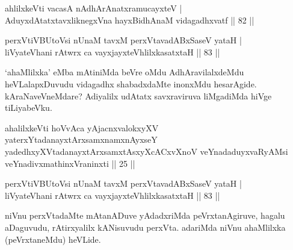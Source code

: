 \begin{shl}
ahlilxkeVti vacasA nA\s \s dhArAnatxramucayxteV |\\
\footnotetext[1]{}AduyxdAtatxtavxliknegxVna hayxBidhAnaM \footnotetext[2]{}vidagadhxvatf \hfill || 82 ||
\end{shl}

\begin{shl}
perxVtiVBUtoV\s si nUnaM tavxM perxVtavadABxSaseV yataH |\\
liVyateV\s hani rAtwrx ca vayxjayxteV\s hlilxkasatxtaH \hfill || 83 ||
\end{shl}

\begin{artha}
`ahaMlilxka' eMba mAtiniMda beVre oMdu AdhAravilalxdeMdu heVLalapxDuvudu vidagadhx shabadxdaMte inonxMdu hesarAgide. kAraNaveVneMdare? Adiyalilx udAtatx savxraviruva liMgadiMda hiVge tiLiyabeVku.
\end{artha}


\begin{kandikeshl}
ahalilxkeVti hoVvAca yAjacnxvalokxyXV yaterxYtadanayxtArxsamxnamxnAyxseY yadedhxyXVtadanayxtArxsamxtAsxyXcACxvXnoV veYnadaduyxvaRyAMsi veYnadivxmathinxVraninxti || 25 ||
\end{kandikeshl}


\begin{shl}
perxVtiVBUtoV\s si nUnaM tavxM perxVtavadABxSaseV yataH |\\
liVyateV\s hani rAtwrx ca vayxjayxteV\s hlilxkasatxtaH \hfill || 83 ||
\end{shl}

\begin{artha}
niVnu perxVtadaMte mAtanADuve yAdadxriMda peVrxtanAgiruve, hagalu aDaguvudu, rAtirxyalilx kANisuvudu perxVta. adariMda niVnu ahaMlilxka (peVrxtaneMdu) heVLide.
\end{artha}

